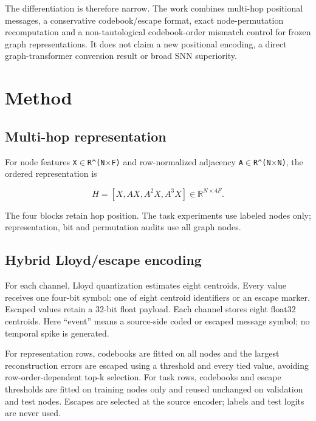 \documentclass{article}
\begin{document}
The differentiation is therefore narrow. The work combines multi-hop positional messages, a conservative codebook/escape format, exact node-permutation recomputation and a non-tautological codebook-order mismatch control for frozen graph representations. It does not claim a new positional encoding, a direct graph-transformer conversion result or broad SNN superiority.

\section{Method}

\label{sec:method}

\subsection{Multi-hop representation}

\label{sec:multi_hop_representation}

For node features \texttt{X$\in$R\textasciicircum{}(N$\times$F)} and row-normalized adjacency \texttt{A$\in$R\textasciicircum{}(N$\times$N)}, the ordered representation is

\[
H = [X, AX, A^2X, A^3X] \in \mathbb{R}^{N\times 4F}.
\]

The four blocks retain hop position. The task experiments use labeled nodes only; representation, bit and permutation audits use all graph nodes.

\subsection{Hybrid Lloyd/escape encoding}

\label{sec:hybrid_lloyd_escape_encoding}

For each channel, Lloyd quantization estimates eight centroids. Every value receives one four-bit symbol: one of eight centroid identifiers or an escape marker. Escaped values retain a 32-bit float payload. Each channel stores eight float32 centroids. Here ``event'' means a source-side coded or escaped message symbol; no temporal spike is generated.

For representation rows, codebooks are fitted on all nodes and the largest reconstruction errors are escaped using a threshold and every tied value, avoiding row-order-dependent top-k selection. For task rows, codebooks and escape thresholds are fitted on training nodes only and reused unchanged on validation and test nodes. Escapes are selected at the source encoder; labels and test logits are never used.
\end{document}
